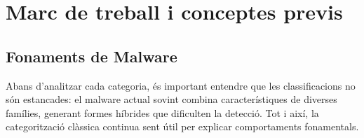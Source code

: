 \documentclass[12pt,a4paper]{report}
\begin{document}
\chapter{Marc de treball i conceptes previs}
\label{ch:marctreball}

\section{Fonaments de Malware}
Abans d'analitzar cada categoria, és important entendre que les classificacions no són estancades: el malware actual sovint combina característiques de diverses famílies, generant formes híbrides que dificulten la detecció. Tot i així, la categorització clàssica continua sent útil per explicar comportaments fonamentals.
\end{document}
